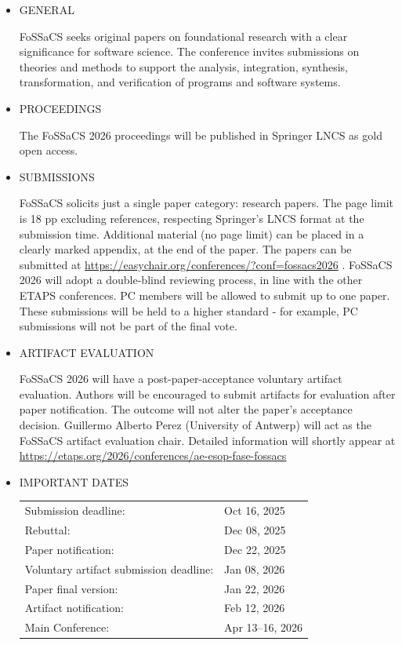 \documentclass[prodmode,acmtecs]{acmsmall} %
\begin{document}
\begin{itemize}\item  GENERAL 
 
  FoSSaCS seeks original papers on foundational research with a clear significance for software science. The conference invites submissions on theories and methods to support the analysis, integration, synthesis, transformation, and verification of programs and software systems. 
 
\item  PROCEEDINGS 
 
  The FoSSaCS 2026 proceedings will be published in Springer LNCS as gold open access. 
 
\item  SUBMISSIONS 
 
  FoSSaCS solicits just a single paper category: research papers. The page limit is 18 pp excluding references, respecting Springer’s LNCS format at the submission time. Additional material (no page limit) can be placed in a clearly marked appendix, at the end of the paper.  The papers can be submitted at \href{https://easychair.org/conferences/?conf=fossacs2026}{https://easychair.org/conferences/?conf=fossacs2026} . FoSSaCS 2026 will adopt a double-blind reviewing process, in line with the other ETAPS conferences. PC members will be allowed to submit up to one paper. These submissions will be held to a higher standard - for example, PC submissions will not be part of the final vote. 
 
\item  ARTIFACT EVALUATION 
 
  FoSSaCS 2026 will have a post-paper-acceptance voluntary artifact evaluation. Authors will be encouraged to submit artifacts for evaluation after paper notification. The outcome will not alter the paper’s acceptance decision. Guillermo Alberto Perez (University of Antwerp) will act as the FoSSaCS artifact  evaluation chair. Detailed information will shortly appear at \href{https://etaps.org/2026/conferences/ae-esop-fase-fossacs}{https://etaps.org/2026/conferences/ae-esop-fase-fossacs} 
 
\item  IMPORTANT DATES 
 
\begin{tabulary}{\linewidth}{LL}Submission deadline:  & Oct 16, 2025 \\
Rebuttal:  & Dec 08, 2025 \\
Paper notification:  & Dec 22, 2025 \\
Voluntary artifact submission deadline:  & Jan 08, 2026 \\
Paper final version:  & Jan 22, 2026 \\
Artifact notification:  & Feb 12, 2026 \\
Main Conference:  & Apr 13–16, 2026 \\
\end{tabulary}
 

\end{itemize}
\end{document}
